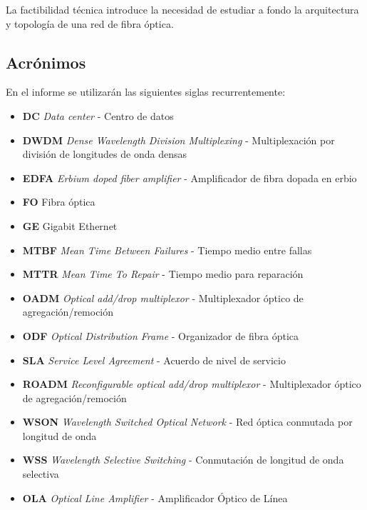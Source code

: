 La factibilidad técnica introduce la necesidad de estudiar a fondo la
arquitectura y topología de una red de fibra óptica.

\subsection{Acrónimos}
\label{sec:acronimos}

En el informe se utilizarán las siguientes siglas recurrentemente:
\begin{itemize}
\item \textbf{DC} \emph{Data center} - Centro de datos
\item \textbf{DWDM} \emph{Dense Wavelength Division Multiplexing} - Multiplexación por división de longitudes de onda densas
\item \textbf{EDFA} \emph{Erbium doped fiber amplifier} - Amplificador de fibra dopada en erbio
\item \textbf{FO} Fibra óptica
\item \textbf{GE} Gigabit Ethernet
\item \textbf{MTBF} \emph{Mean Time Between Failures} - Tiempo medio entre fallas
\item \textbf{MTTR} \emph{Mean Time To Repair} - Tiempo medio para reparación
\item \textbf{OADM} \emph{Optical add/drop multiplexor} - Multiplexador óptico de agregación/remoción
\item \textbf{ODF} \emph{Optical Distribution Frame} - Organizador de fibra óptica
\item \textbf{SLA} \emph{Service Level Agreement} - Acuerdo de nivel de servicio
\item \textbf{ROADM} \emph{Reconfigurable optical add/drop multiplexor} - Multiplexador óptico de agregación/remoción
\item \textbf{WSON} \emph{Wavelength Switched Optical Network} - Red óptica conmutada por longitud de onda
\item \textbf{WSS} \emph{Wavelength Selective Switching} - Conmutación de longitud de onda selectiva
\item \textbf{OLA} \emph{Optical Line Amplifier} - Amplificador Óptico de Línea
\end{itemize}